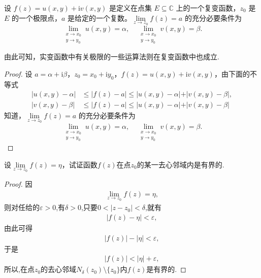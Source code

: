 \documentclass[../../main.tex]{subfiles}%
\begin{document}
\begin{theorem}\label{theorem:复变函数极限存在充要条件1.7}
设 $f(z) = u(x, y) + \mathrm{i}v(x, y)$ 是定义在点集 $E\subseteq \mathbb{C}$ 上的一个复变函数，$z_0$ 是 $E$ 的一个极限点，$a$ 是给定的一个复数。$\lim\limits_{z \to z_0} f(z) = a$ 的充分必要条件为
\[
\lim_{\substack{x \to x_0 \\ y \to y_0}} u(x, y) = \alpha, \quad \lim_{\substack{x \to x_0 \\ y \to y_0}} v(x, y) = \beta.
\]
\end{theorem}
\begin{note}
由此可知，实变函数中有关极限的一些运算法则在复变函数中也成立.
\end{note}
\begin{proof}
设 $a = \alpha + \mathrm{i}\beta$，$z_0 = x_0 + \mathrm{i}y_0$，$f(z) = u(x, y) + \mathrm{i}v(x, y)$，由下面的不等式
\begin{align*}
\vert u(x, y) - \alpha \vert &\leqslant \vert f(z) - a \vert \leqslant \vert u(x, y) - \alpha \vert + \vert v(x, y) - \beta \vert, \\
\vert v(x, y) - \beta \vert &\leqslant \vert f(z) - a \vert \leqslant \vert u(x, y) - \alpha \vert + \vert v(x, y) - \beta \vert 
\end{align*}
知道，$\lim\limits_{z \to z_0} f(z) = a$ 的充分必要条件为
\[
\lim_{\substack{x \to x_0 \\ y \to y_0}} u(x, y) = \alpha, \quad \lim_{\substack{x \to x_0 \\ y \to y_0}} v(x, y) = \beta.
\]
\end{proof}

\begin{proposition}\label{proposition:复变函数--例题1.31}
设$\lim\limits_{z\to z_0}f(z)=\eta$，试证函数$f(z)$在点$z_0$的某一去心邻域内是有界的.
\end{proposition}
\begin{proof}
因
\begin{align*}
\lim\limits_{z\to z_0}f(z)=\eta,
\end{align*}
则对任给的$\varepsilon>0$,有$\delta>0$,只要$0<|z-z_0|<\delta$,就有
\begin{align*}
|f(z)-\eta|<\varepsilon,
\end{align*}
由此可得
\begin{align*}
|f(z)|-|\eta|<\varepsilon,
\end{align*}
于是
\begin{align*}
|f(z)|<|\eta|+\varepsilon,
\end{align*}
所以,在点$z_0$的去心邻域$N_\delta(z_0)\setminus\{z_0\}$内$f(z)$是有界的.
\end{proof}
\end{document}
